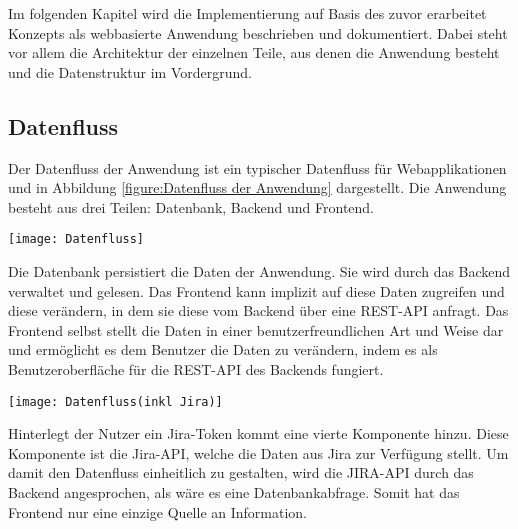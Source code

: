 
Im folgenden Kapitel wird die Implementierung auf Basis des zuvor erarbeitet Konzepts als webbasierte Anwendung beschrieben und dokumentiert. Dabei steht vor allem die Architektur der einzelnen Teile, aus denen die Anwendung besteht und die Datenstruktur im Vordergrund.

\subsection{Datenfluss}
Der Datenfluss der Anwendung ist ein typischer Datenfluss für Webapplikationen und in Abbildung \ref{figure:Datenfluss der Anwendung} dargestellt. Die Anwendung besteht aus drei Teilen: Datenbank, Backend und Frontend.

\vspace{20pt}
\begin{center}
    \begin{minipage}{1\linewidth}
        \texttt{[image: Datenfluss]}
        \label{figure:Datenfluss der Anwendung}
    \end{minipage}
\end{center}
\vspace{20pt}

Die Datenbank persistiert die Daten der Anwendung. Sie wird durch das Backend verwaltet und gelesen. Das Frontend kann implizit auf diese Daten zugreifen und diese verändern, in dem sie diese vom Backend über eine REST-API anfragt. Das Frontend selbst stellt die Daten in einer benutzerfreundlichen Art und Weise dar und ermöglicht es dem Benutzer die Daten zu verändern, indem es als Benutzeroberfläche für die REST-API des Backends fungiert.

\vspace{20pt}
\begin{center}
    \begin{minipage}{1\linewidth}
        \texttt{[image: Datenfluss(inkl Jira)]}
    \end{minipage}
\end{center}
\vspace{20pt}

Hinterlegt der Nutzer ein Jira-Token kommt eine vierte Komponente hinzu. Diese Komponente ist die Jira-API, welche die Daten aus Jira zur Verfügung stellt. Um damit den Datenfluss einheitlich zu gestalten, wird die JIRA-API durch das Backend angesprochen, als wäre es eine Datenbankabfrage. Somit hat das Frontend nur eine einzige Quelle an Information.

